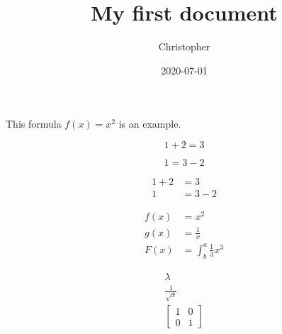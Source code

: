 \documentclass{article}
\title{My first document}
\date{2020-07-01}
\author{Christopher}
\begin{document}
	\maketitle
	
	This formula $f(x) = x^2$ is an example.
	
	\begin{equation*}
		1 + 2 = 3
	\end{equation*}

	\begin{equation*}
		1 = 3 - 2
	\end{equation*}

	\begin{align*}
		1 + 2 &= 3 \\
		1 &= 3 - 2
	\end{align*}
	
	\begin{align*}
		f(x) &= x^2 \\
		g(x) &= \frac{1}{x} \\
		F(x) &= \int^a_b \frac{1}{3}x^3
	\end{align*}
	
	\begin{align}
		\lambda \\
		\frac{1}{\sqrt{x}} \\
		\left[
		\begin{matrix}
			1 & 0 \\
			0 & 1
		\end{matrix}
		\right]
	\end{align}
\end{document}

